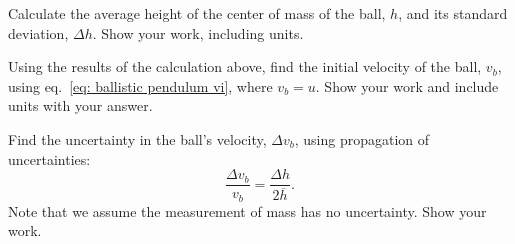 \documentclass[addpoints]{physlabs}
\begin{document}
\begin{postlab}
\begin{solution}[1cm]
    \end{solution}

    \filbreak
    \question[1] Calculate the average height of the center of mass of the ball, $h$, and its standard deviation, $\Delta h$. Show your work, including units.
    \begin{solution}[3cm]
        
    \end{solution}

    \filbreak
    \question[1] \label{q: ballistic velocity} Using the results of the calculation above, find the initial velocity of the ball, $v_b$, using eq.~\ref{eq: ballistic pendulum vi}, where $v_b=u$. Show your work and include units with your answer.
    \begin{solution}[3cm]
        
    \end{solution}

    \filbreak
    \question[1] \label{q: ballistic uncertainty} Find the uncertainty in the ball's velocity, $\Delta v_b$, using propagation of uncertainties:
    \[
        \frac{\Delta v_b}{v_b} = \frac{\Delta h}{2\overline{h}}.
    \]
    Note that we assume the measurement of mass has no uncertainty. Show your work.
    \begin{solution}[3cm]
        
    \end{solution}
    

    \newpage
    


\end{postlab}
\end{document}
